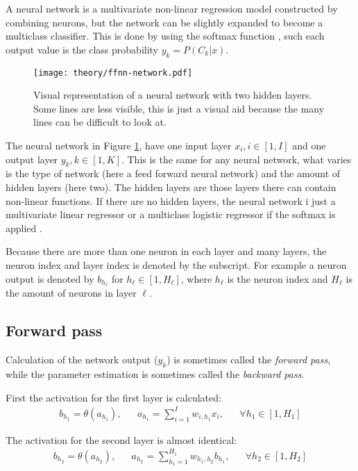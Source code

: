 A neural network is a multivariate non-linear regression model constructed by combining neurons, but the network can be slightly expanded to become a multiclass classifier. This is done by using the softmax function \cite{the-elements-of-statistical-learning}, such each output value is the class probability $y_k = P(C_k | x)$.

\begin{figure}[h]
	\centering
	\texttt{[image: theory/ffnn-network.pdf]}
	\caption{Visual representation of a neural network with two hidden layers. Some lines are less visible, this is just a visual aid because the many lines can be difficult to look at.}
	\label{fig:theory:ffnn:network}
\end{figure}

The neural network in Figure \ref{fig:theory:ffnn:network}, have one input layer $x_i, i \in [1, I]$ and one output layer $y_k, k \in [1, K]$. This is the same for any neural network, what varies is the type of network (here a feed forward neural network) and the amount of hidden layers (here two). The hidden layers are those layers there can contain non-linear functions. If there are no hidden layers, the neural network i just a multivariate linear regressor or a multiclass logistic regressor if the softmax is applied \cite{bishop}.

Because there are more than one neuron in each layer and many layers, the neuron index and layer index is denoted by the subscript. For example a neuron output is denoted by $b_{h_{\ell}}$ for $h_{\ell} \in [1, H_{\ell}]$, where $h_{\ell}$ is the neuron index and $H_\ell$ is the amount of neurons in layer $\ell$.

\subsection{Forward pass}

Calculation of the network output ($y_k$) is sometimes called the \textit{forward pass}, while the parameter estimation is sometimes called the \textit{backward pass}.

First the activation for the first layer is calculated:
\begin{equation}
\begin{aligned}
b_{h_1} = \theta(a_{h_1}), && a_{h_1} = \sum_{i = 1}^I w_{i, h_1} x_i, && \forall h_1 \in [1, H_1]
\end{aligned}
\end{equation}

The activation for the second layer is almost identical:
\begin{equation}
\begin{aligned}
b_{h_2} = \theta(a_{h_2}), && a_{h_2} = \sum_{h_1 = 1}^{H_1} w_{h_1, h_2} b_{h_1}, && \forall h_2 \in [1, H_2]
\end{aligned}
\end{equation}

